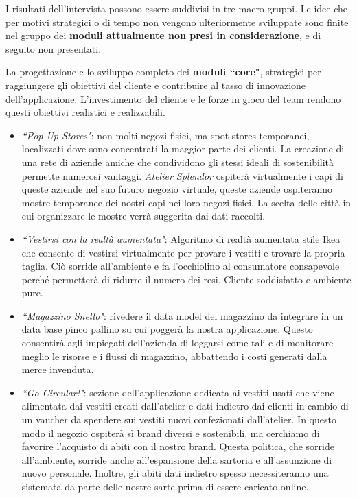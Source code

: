 \documentclass[12pt]{article}
\begin{document}
I risultati dell'intervista possono essere suddivisi in tre macro gruppi.
Le idee che per motivi strategici o di tempo non vengono ulteriormente sviluppate sono finite nel gruppo dei \textbf{moduli attualmente non presi in considerazione}, e di seguito non presentati.

La progettazione e lo sviluppo completo dei \textbf{moduli ``core"}, strategici per raggiungere gli obiettivi del cliente e contribuire al tasso di innovazione dell'applicazione. L'investimento del cliente e le forze in gioco del team rendono questi obiettivi realistici e realizzabili.

\begin{itemize}
    \item {\em ``Pop-Up Stores"}: non molti negozi fisici, ma spot stores temporanei, localizzati dove sono concentrati la maggior parte dei clienti. La creazione di una rete di aziende amiche che condividono gli stessi ideali di sostenibilità permette numerosi vantaggi. {\em Atelier Splendor} ospiterà virtualmente i capi di queste aziende nel suo futuro negozio virtuale, queste aziende ospiteranno mostre temporanee dei nostri capi nei loro negozi fisici. La scelta delle città in cui organizzare le mostre verrà suggerita dai dati raccolti.
    \item {\em ``Vestirsi con la realtà aumentata"}: Algoritmo di realtà aumentata stile Ikea che consente di vestirsi virtualmente per provare i vestiti e trovare la propria taglia. Ciò sorride all'ambiente e fa l'occhiolino al consumatore consapevole perché permetterà di ridurre il numero dei resi. Cliente soddisfatto e ambiente pure. 
    \item {\em ``Magazzino Snello"}: rivedere il data model del magazzino da integrare in un data base pinco pallino su cui poggerà la nostra applicazione. Questo consentirà agli impiegati dell'azienda di loggarsi come tali e di monitorare meglio le risorse e i flussi di magazzino, abbattendo i costi generati dalla merce invenduta.
    \item {\em ``Go Circular!"}: sezione dell'applicazione dedicata ai vestiti usati che viene alimentata dai vestiti creati dall'atelier e dati indietro dai clienti in cambio di un vaucher da spendere sui vestiti nuovi confezionati dall'atelier. In questo modo il negozio ospiterà sì brand diversi e sostenibili, ma cerchiamo di favorire l'acquisto di abiti con il nostro brand. Questa politica, che sorride all'ambiente, sorride anche all'espansione della sartoria e all'assunzione di nuovo personale. Inoltre, gli abiti dati indietro spesso necessiteranno una sistemata da parte delle nostre sarte prima di essere caricato online.
    
\end{itemize}
\end{document}
